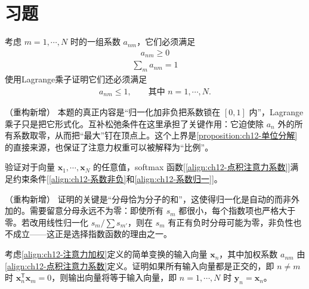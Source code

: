 \documentclass[../../main.tex]{subfiles}
\begin{document}
\section{习题}\label{section:ch12-习题}

\begin{exercise}\label{exercise:ch12-01}
考虑 $m=1,\cdots,N$ 时的一组系数 $a_{nm}$，它们必须满足
\begin{align}
a_{nm}\geqslant0
\label{align:ch12-习题系数非负}
\end{align}
\begin{align}
\sum_{m}a_{nm}=1
\label{align:ch12-习题系数归一}
\end{align}
使用Lagrange乘子证明它们还必须满足
\begin{align}
a_{nm}\leqslant1,\qquad \text{其中 }n=1,\cdots,N.
\label{align:ch12-习题系数上界}
\end{align}
\end{exercise}

\begin{remark}（重构新增）
本题的真正内容是“归一化加非负把系数锁在 $[0,1]$ 内”，Lagrange乘子只是把它形式化。互补松弛条件在这里承担了关键作用：它迫使除 $a_n$ 外的所有系数取零，从而把“最大”钉在顶点上。这个上界是\cref{proposition:ch12-单位分解}的直接来源，也保证了注意力权重可以被解释为“比例”。
\end{remark}

\begin{exercise}[（$\star$）]\label{exercise:ch12-02}
验证对于向量 $\mathbf{x}_1,\cdots,\mathbf{x}_N$ 的任意值，softmax 函数[\eqref{align:ch12-点积注意力系数}]满足约束条件[\eqref{align:ch12-系数非负}和\eqref{align:ch12-系数归一}]。
\end{exercise}

\begin{remark}（重构新增）
证明的关键是“分母恰为分子的和”，这使得归一化是自动的而非外加的。需要留意分母永远不为零：即使所有 $s_m$ 都很小，每个指数项也严格大于零。若改用线性归一化 $s_m/\sum s_{m'}$，则在 $s_m$ 有正有负时分母可能为零，非负性也不成立——这正是选择指数函数的理由之一。
\end{remark}

\begin{exercise}[（$\star$）]\label{exercise:ch12-03}
考虑\eqref{align:ch12-注意力加权}定义的简单变换的输入向量 $\mathbf{x}_n$，其中加权系数 $a_{nm}$ 由\eqref{align:ch12-点积注意力系数}定义。证明如果所有输入向量都是正交的，即 $n\neq m$ 时 $\mathbf{x}_n^{\mathsf{T}}\mathbf{x}_m=0$，则输出向量将等于输入向量，即 $n=1,\cdots,N$ 时 $\mathbf{y}_n=\mathbf{x}_n$。
\end{exercise}
\end{document}
